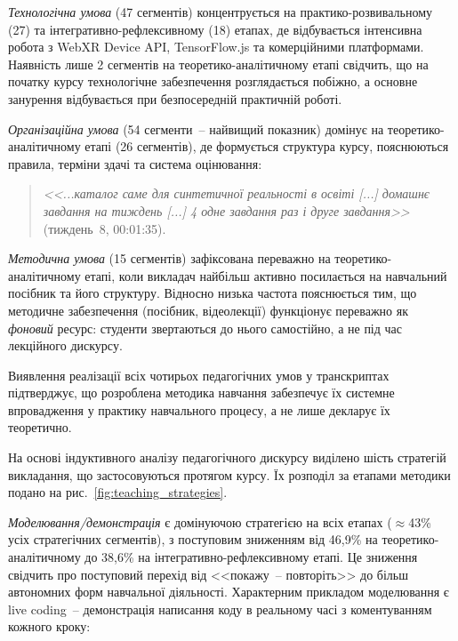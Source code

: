 \textit{Технологічна умова} (47 сегментів) концентрується на практико-розвивальному (27) та інтегративно-рефлексивному (18) етапах, де відбувається інтенсивна робота з WebXR Device API, TensorFlow.js та комерційними платформами. Наявність лише 2 сегментів на теоретико-аналітичному етапі свідчить, що на початку курсу технологічне забезпечення розглядається побіжно, а основне занурення відбувається при безпосередній практичній роботі.

\textit{Організаційна умова} (54 сегменти~-- найвищий показник) домінує на теоретико-аналітичному етапі (26 сегментів), де формується структура курсу, пояснюються правила, терміни здачі та система оцінювання:

\begin{quote}
\textit{<<...каталог саме для синтетичної реальності в освіті \textnormal{[...]} домашнє завдання на тиждень \textnormal{[...]} 4 одне завдання раз і друге завдання>>} (тиждень~8, 00:01:35).
\end{quote}

\textit{Методична умова} (15 сегментів) зафіксована переважно на теоретико-аналітичному етапі, коли викладач найбільш активно посилається на навчальний посібник та його структуру. Відносно низька частота пояснюється тим, що методичне забезпечення (посібник, відеолекції) функціонує переважно як \textit{фоновий} ресурс: студенти звертаються до нього самостійно, а не під час лекційного дискурсу.

Виявлення реалізації всіх чотирьох педагогічних умов у транскриптах підтверджує, що розроблена методика навчання забезпечує їх системне впровадження у практику навчального процесу, а не лише декларує їх теоретично.


На основі індуктивного аналізу педагогічного дискурсу виділено шість стратегій викладання, що застосовуються протягом курсу. Їх розподіл за етапами методики подано на рис.~\ref{fig:teaching_strategies}.



\textit{Моделювання/демонстрація} є домінуючою стратегією на всіх етапах ($\approx$43\% усіх стратегічних сегментів), з поступовим зниженням від 46,9\% на теоретико-аналітичному до 38,6\% на інтегративно-рефлексивному етапі. Це зниження свідчить про поступовий перехід від <<покажу~-- повторіть>> до більш автономних форм навчальної діяльності. Характерним прикладом моделювання є live coding~-- демонстрація написання коду в реальному часі з коментуванням кожного кроку:

